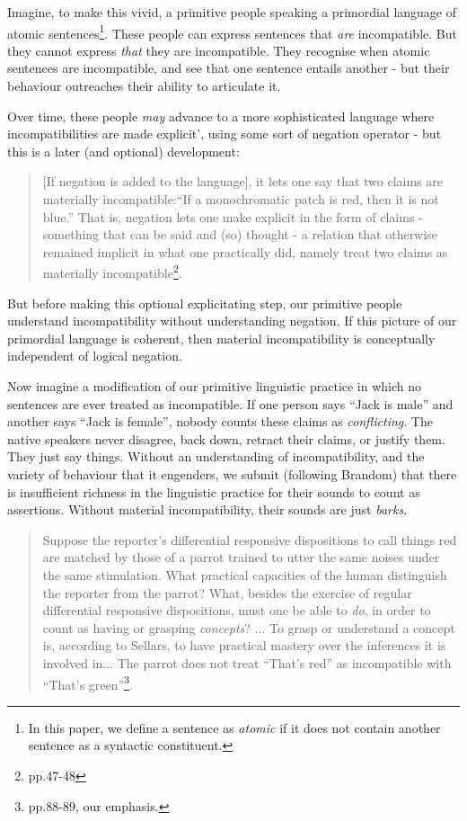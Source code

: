 Imagine, to make this vivid, a primitive people speaking a primordial
language of atomic sentences\footnote{In this paper, we define a sentence as \emph{atomic} if it does
  not contain another sentence as a syntactic constituent.}. These people can express sentences
that \emph{are} incompatible.  But they cannot express \emph{that}
they are incompatible.  They recognise when atomic sentences are
incompatible, and see that one sentence entails another - but their
behaviour outreaches their ability to articulate it.

Over time, these people \emph{may} advance to a more
sophisticated language where incompatibilities are made explicit', using some sort of negation operator - but this is a later (and optional) development:
\begin{quote}
[If negation is added to the language], it lets one say that two
claims are materially incompatible:``If a monochromatic patch is red,
then it is not blue.'' That is, negation lets one make explicit in the
form of claims - something that can be said and (so) thought - a
relation that otherwise remained implicit in what one practically did,
namely treat two claims as materially
incompatible\footnote{\cite{brandom} pp.47-48}.
\end{quote}

\NI But before making this optional
explicitating step, our primitive people understand incompatibility
without understanding negation.  If this picture of our primordial
language is coherent, then material incompatibility is conceptually
independent of logical negation.

Now imagine a modification of our primitive linguistic practice in
which no sentences are ever treated as incompatible.  If one person
says ``Jack is male'' and another says ``Jack is female'', nobody
counts these claims as \emph{conflicting}.  The native speakers never
disagree, back down, retract their claims, or justify them. They just
say things.  Without an understanding of incompatibility, and the
variety of behaviour that it engenders, we submit (following Brandom)
that there is insufficient richness in the linguistic practice for
their sounds to count as assertions.  Without material
incompatibility, their sounds are just \emph{barks}.
\begin{quote}

  Suppose the reporter's differential responsive dispositions to call
  things red are matched by those of a parrot trained to utter the
  same noises under the same stimulation. What practical capacities of
  the human distinguish the reporter from the parrot? What, besides
  the exercise of regular differential responsive dispositions, must
  one be able to \emph{do}, in order to count as having or grasping
  \emph{concepts}? ... To grasp or understand a concept is, according
  to Sellars, to have practical mastery over the inferences it is
  involved in... The parrot does not treat ``That's red'' as
  incompatible with ``That's green''\footnote{\cite{brandom2}
    pp.88-89, our emphasis.}.
\end{quote}

